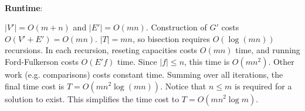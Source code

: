 \documentclass{article}
\begin{document}
~

\noindent\textbf{Runtime}:

$|V'|=O(m+n)$ and $|E'|=O(mn)$. Construction of $G'$ costs $O(V'+E')=O(mn)$. $|T|=mn$, so bisection requires $O(\log(mn))$ recursions. In each recursion, reseting capacities costs $O(mn)$ time, and running Ford-Fulkerson costs $O(E'f)$ time. Since $|f|\leqslant n$, this time is $O(mn^2)$. Other work (e.g. comparisons) costs constant time. Summing over all iterations, the final time cost is $T=O(mn^2\log(mn))$. Notice that $n\leqslant m$ is required for a solution to exist. This simplifies the time cost to $T=O(mn^2\log m)$.
\end{document}
